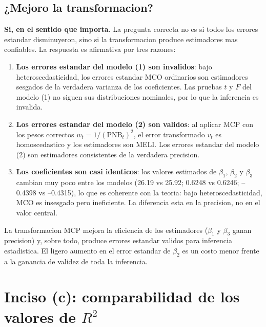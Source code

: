 \documentclass[12pt, letterpaper]{article}
\theoremstyle{remark}
\begin{document}
\subsection{¿Mejoro la transformacion?}

\textbf{Si, en el sentido que importa}. La pregunta correcta no es si todos
los errores estandar disminuyeron, sino si la transformacion produce
estimadores mas confiables. La respuesta es afirmativa por tres razones:

\begin{enumerate}[leftmargin=1.8em, itemsep=5pt]
  \item \textbf{Los errores estandar del modelo (1) son invalidos}: bajo
    heteroscedasticidad, los errores estandar MCO ordinarios son estimadores
    sesgados de la verdadera varianza de los coeficientes. Las pruebas $t$ y
    $F$ del modelo (1) no siguen sus distribuciones nominales, por lo que la
    inferencia es invalida.

  \item \textbf{Los errores estandar del modelo (2) son validos}: al aplicar
    MCP con los pesos correctos $w_t = 1/(\text{PNB}_t)^2$, el error
    transformado $v_t$ es homoscedastico y los estimadores son MELI.
    Los errores estandar del modelo (2) son estimadores consistentes de la
    verdadera precision.

  \item \textbf{Los coeficientes son casi identicos}: los valores estimados
    de $\beta_1$, $\beta_2$ y $\beta_3$ cambian muy poco entre los modelos
    (26.19 vs 25.92; 0.6248 vs 0.6246; --0.4398 vs --0.4315), lo que es
    coherente con la teoria: bajo heteroscedasticidad, MCO es insesgado pero
    ineficiente. La diferencia esta en la precision, no en el valor central.
\end{enumerate}

\begin{clave}
  La transformacion MCP mejora la eficiencia de los estimadores ($\beta_1$ y
  $\beta_3$ ganan precision) y, sobre todo, produce errores estandar validos
  para inferencia estadistica. El ligero aumento en el error estandar de
  $\beta_2$ es un costo menor frente a la ganancia de validez de toda la
  inferencia.
\end{clave}

\section{Inciso (c): comparabilidad de los valores de $R^2$}
\end{document}
